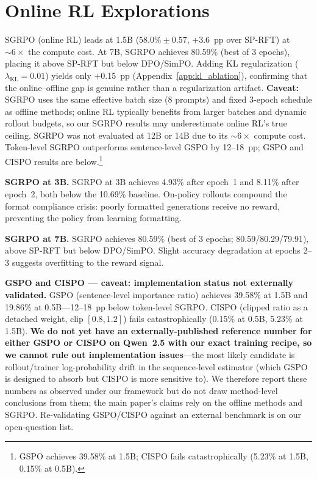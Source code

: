 \documentclass{article}
\newcommand{\sprft}{SP-RFT}
\begin{document}
\section{Online RL Explorations}
\label{app:online_rl}

SGRPO (online RL) leads at 1.5B ($58.0\% \pm 0.57$, +3.6~pp over \sprft{}) at ${\sim}6\times$ the compute cost.
At 7B, SGRPO achieves 80.59\% (best of 3 epochs), placing it above \sprft{} but below DPO/SimPO. Adding KL regularization ($\lambda_{\text{KL}} = 0.01$) yields only +0.15~pp (Appendix~\ref{app:kl_ablation}), confirming that the online--offline gap is genuine rather than a regularization artifact. \textbf{Caveat:} SGRPO uses the same effective batch size (8 prompts) and fixed 3-epoch schedule as offline methods; online RL typically benefits from larger batches and dynamic rollout budgets, so our SGRPO results may underestimate online RL's true ceiling. SGRPO was not evaluated at 12B or 14B due to its ${\sim}6\times$ compute cost. Token-level SGRPO outperforms sentence-level GSPO by 12--18~pp; GSPO and CISPO results are below.\footnote{GSPO achieves 39.58\% at 1.5B; CISPO fails catastrophically (5.23\% at 1.5B, 0.15\% at 0.5B).}

\textbf{SGRPO at 3B.}
SGRPO at 3B achieves 4.93\% after epoch~1 and 8.11\% after epoch~2, both below the 10.69\% baseline. On-policy rollouts compound the format compliance crisis: poorly formatted generations receive no reward, preventing the policy from learning formatting.

\textbf{SGRPO at 7B.}
SGRPO achieves 80.59\% (best of 3 epochs; 80.59/80.29/79.91), above \sprft{} but below DPO/SimPO. Slight accuracy degradation at epochs 2--3 suggests overfitting to the reward signal.

\textbf{GSPO and CISPO --- caveat: implementation status not externally validated.}
GSPO (sentence-level importance ratio) achieves 39.58\% at 1.5B and 19.86\% at 0.5B---12--18~pp below token-level SGRPO. CISPO (clipped ratio as a detached weight, clip $[0.8, 1.2]$) fails catastrophically (0.15\% at 0.5B, 5.23\% at 1.5B). \textbf{We do not yet have an externally-published reference number for either GSPO or CISPO on Qwen~2.5 with our exact training recipe, so we cannot rule out implementation issues}---the most likely candidate is rollout/trainer log-probability drift in the sequence-level estimator (which GSPO is designed to absorb but CISPO is more sensitive to). We therefore report these numbers as observed under our framework but do not draw method-level conclusions from them; the main paper's claims rely on the offline methods and SGRPO. Re-validating GSPO/CISPO against an external benchmark is on our open-question list.
\end{document}
